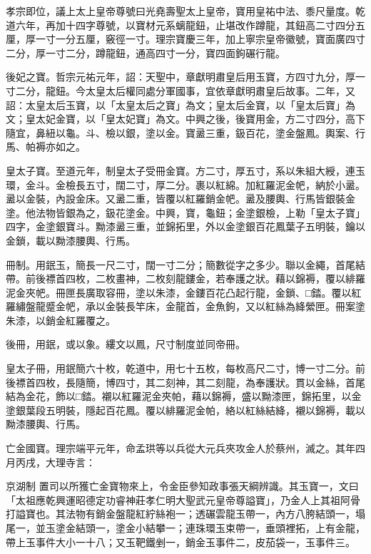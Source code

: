 \begin{pinyinscope}
 孝宗即位，議上太上皇帝尊號曰光堯壽聖太上皇帝，寶用皇祐中法、黍尺量度。乾道六年，再加十四字尊號，以寶材元系螭龍鈕，止堪改作蹲龍，其鈕高二寸四分五厘，厚一寸一分五厘，竅徑一寸。理宗寶慶三年，加上寧宗皇帝徽號，寶面廣四寸二分，厚一寸二分，蹲龍鈕，通高四寸一分，寶四面鉤碾行龍。



 後妃之寶。哲宗元祐元年，詔：天聖中，章獻明肅皇后用玉寶，方四寸九分，厚一寸二分，龍鈕。今太皇太后權同處分軍國事，宜依章獻明肅皇后故事。二年，又詔：太皇太后玉寶，以「太皇太后之寶」為文；皇太后金寶，以「皇太后寶」為文；皇太妃金寶，以「皇太妃寶」為文。中興之後，後寶用金，方二寸四分，高下隨宜，鼻紐以龜。斗、檢以銀，塗以金。寶盝三重，鈒百花，塗金盤鳳。輿案、行馬、帕褥亦如之。



 皇太子寶。至道元年，制皇太子受冊金寶。方二寸，厚五寸，系以朱組大綬，連玉環，金斗。金檢長五寸，闊二寸，厚二分。裹以紅綿。加紅羅泥金帊，納於小盝。盝以金裝，內設金床。又盝二重，皆覆以紅羅銷金帊。盝及腰輿、行馬皆銀裝金塗。他法物皆銀為之，鈒花塗金。中興，寶，龜鈕；金塗銀檢，上勒「皇太子寶」四字，金塗銀寶斗。黝漆盝三重，並錦拓里，外以金塗銀百花鳳葉子五明裝，鑰以金鎖，載以黝漆腰輿、行馬。



 冊制。用鈱玉，簡長一尺二寸，闊一寸二分；簡數從字之多少。聯以金繩，首尾結帶。前後褾首四枚，二枚畫神，二枚刻龍鏤金，若奉護之狀。藉以錦褥，覆以緋羅泥金夾帊。冊匣長廣取容冊，塗以朱漆，金鏤百花凸起行龍，金鎖、□錔。覆以紅羅繡盤龍蹙金帊，承以金裝長竿床，金龍首，金魚鉤，又以紅絲為絳縈匣。冊案塗朱漆，以銷金紅羅覆之。



 後冊，用鈱，或以象。縷文以鳳，尺寸制度並同帝冊。



 皇太子冊，用鈱簡六十枚，乾道中，用七十五枚，每枚高尺二寸，博一寸二分。前後褾首四枚，長隨簡，博四寸，其二刻神，其二刻龍，為奉護狀。貫以金絲，首尾結為金花，飾以□錔。襯以紅羅泥金夾帕，藉以錦褥，盛以黝漆匣，錦拓里，以金塗銀葉段五明裝，隱起百花鳳。覆以緋羅泥金帕，絡以紅絲結絳，襯以錦褥，載以黝漆腰輿、行馬。



 亡金國寶。理宗端平元年，命孟珙等以兵從大元兵夾攻金人於蔡州，滅之。其年四月丙戌，大理寺言：



 京湖制
 置司以所獲亡金寶物來上，令金臣參知政事張天綱辨識。其玉寶一，文曰「太祖應乾興運昭德定功睿神莊孝仁明大聖武元皇帝尊謚寶」，乃金人上其祖阿骨打謚寶也。其法物有銷金盤龍紅紵絲袍一；透碾雲龍玉帶一，內方八胯結頭一，塌尾一，並玉塗金結頭一，塗金小結攀一；連珠環玉束帶一，垂頭裡拓，上有金龍，帶上玉事件大小一十八；又玉靶鐵剉一，銷金玉事件二，皮茄袋一，玉事件三。




\end{pinyinscope}
